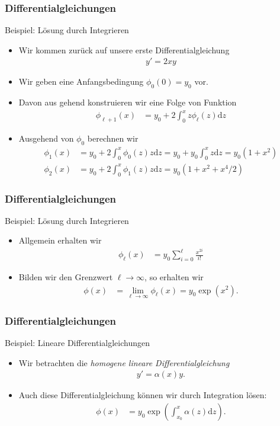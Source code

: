\documentclass{beamer}
\renewcommand{\emph}[1]{{\textcolor{solarizedRed}{\itshape #1}}}
\newcommand\dd{\mathrm d}
\newcommand\bc[1]{\left({#1}\right)}
\renewcommand{\oe}{\"o}
\newcommand{\ue}{\"u}
\newcommand{\mytitle}{Differentialgleichungen}
\begin{document}
\begin{frame}\frametitle{\mytitle}
	\begin{block}{Beispiel: L\oe sung durch Integrieren}
		\begin{itemize}
			\item Wir kommen zur\ue ck auf unsere erste Differentialgleichung
				\begin{align*}
				y'=2xy
				\end{align*}
			\item Wir geben eine \alert{Anfangsbedingung} $\phi_0(0)=y_0$ vor.
			\item Davon aus gehend konstruieren wir eine Folge von Funktion
				\begin{align*}
					\phi_{\ell+1}(x)&=y_0+2\int_0^xz\phi_\ell(z)\dd z
				\end{align*}
			\item Ausgehend von $\phi_0$ berechnen wir
				\begin{align*}
					\phi_1(x)&=y_0+2\int_0^x\phi_0(z)z\dd z=y_0+y_0\int_0^xz\dd z=y_0(1+x^2)\\
					\phi_2(x)&=y_0+2\int_0^x\phi_1(z)z\dd z=y_0(1+x^2+x^4/2)
				\end{align*}
		\end{itemize}
	\end{block}
\end{frame}

\begin{frame}\frametitle{\mytitle}
	\begin{block}{Beispiel: L\oe sung durch Integrieren}
		\begin{itemize}
			\item Allgemein erhalten wir
				\begin{align*}
					\phi_\ell(x)&=y_0\sum_{i=0}^\ell\frac{x^{2i}}{i!}
				\end{align*}
			\item Bilden wir den Grenzwert $\ell\to\infty$, so erhalten wir
				\begin{align*}
					\phi(x)&=\lim_{\ell\to\infty}\phi_\ell(x)=y_0\exp(x^2).
				\end{align*}
		\end{itemize}
	\end{block}
\end{frame}

\begin{frame}\frametitle{\mytitle}
	\begin{block}{Beispiel: Lineare Differentialgleichungen}
		\begin{itemize}
			\item Wir betrachten die \emph{homogene lineare Differentialgleichung}
				\begin{align*}
					y'=\alpha(x)y.
				\end{align*}
			\item Auch diese Differentialgleichung k\oe nnen wir durch Integration l\oe sen:
				\begin{align*}
					\phi(x)&=y_0\exp\bc{\int_{x_0}^x\alpha(z)\dd z}.
				\end{align*}
		\end{itemize}
	\end{block}
\end{frame}
\end{document}

